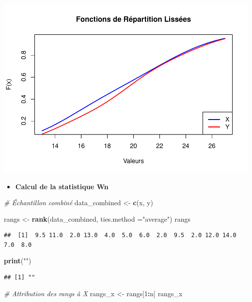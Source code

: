 \documentclass[
  12pt,
]{article}
\newenvironment{Shaded}{\begin{snugshade}}{\end{snugshade}}
\newcommand{\AttributeTok}[1]{\textcolor[rgb]{0.13,0.29,0.53}{#1}}
\newcommand{\CommentTok}[1]{\textcolor[rgb]{0.56,0.35,0.01}{\textit{#1}}}
\newcommand{\DecValTok}[1]{\textcolor[rgb]{0.00,0.00,0.81}{#1}}
\newcommand{\FunctionTok}[1]{\textcolor[rgb]{0.13,0.29,0.53}{\textbf{#1}}}
\newcommand{\NormalTok}[1]{#1}
\newcommand{\OtherTok}[1]{\textcolor[rgb]{0.56,0.35,0.01}{#1}}
\newcommand{\SpecialCharTok}[1]{\textcolor[rgb]{0.81,0.36,0.00}{\textbf{#1}}}
\newcommand{\StringTok}[1]{\textcolor[rgb]{0.31,0.60,0.02}{#1}}
\providecommand{\tightlist}{%
  \setlength{\itemsep}{0pt}\setlength{\parskip}{0pt}}
\begin{document}
\includegraphics{Stat_non_para_files/figure-latex/unnamed-chunk-73-1.pdf}

\begin{itemize}
\tightlist
\item
  \textbf{Calcul de la statistique Wn}
\end{itemize}

\begin{Shaded}
\begin{Highlighting}[]
\CommentTok{\# Échantillon combiné}
\NormalTok{data\_combined }\OtherTok{\textless{}{-}} \FunctionTok{c}\NormalTok{(x, y)}

\NormalTok{rangs }\OtherTok{\textless{}{-}} \FunctionTok{rank}\NormalTok{(data\_combined, }\AttributeTok{ties.method =}\StringTok{"average"}\NormalTok{)}
\NormalTok{rangs}
\end{Highlighting}
\end{Shaded}

\begin{verbatim}
##  [1]  9.5 11.0  2.0 13.0  4.0  5.0  6.0  2.0  9.5  2.0 12.0 14.0  7.0  8.0
\end{verbatim}

\begin{Shaded}
\begin{Highlighting}[]
\FunctionTok{print}\NormalTok{(}\StringTok{""}\NormalTok{)}
\end{Highlighting}
\end{Shaded}

\begin{verbatim}
## [1] ""
\end{verbatim}

\begin{Shaded}
\begin{Highlighting}[]
\CommentTok{\# Attribution des rangs à X}
\NormalTok{rangs\_x }\OtherTok{\textless{}{-}}\NormalTok{ rangs[}\DecValTok{1}\SpecialCharTok{:}\NormalTok{n]}
\NormalTok{rangs\_x}
\end{Highlighting}
\end{Shaded}
\end{document}

